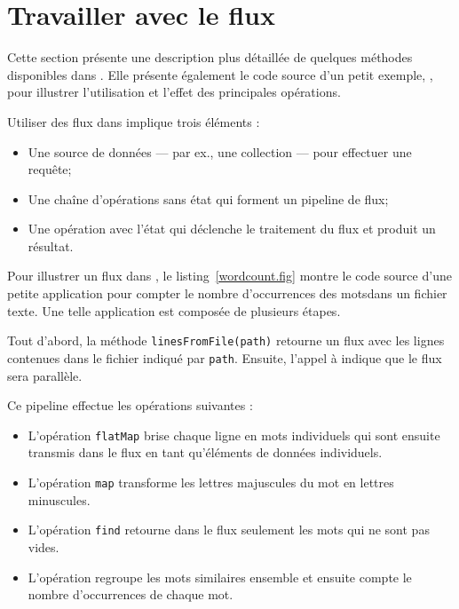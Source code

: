 \section{Travailler avec le flux}

Cette section pr\'esente une description plus d\'etaill\'ee de quelques m\'ethodes disponibles dans \PpFf. Elle pr\'esente \'egalement le code source d'un petit exemple, , pour illustrer l'utilisation et l'effet des principales op\'erations. 

Utiliser des flux dans \PpFf{} implique trois \'el\'ements : 
\begin{itemize}
	\item Une source de donn\'ees --- par ex., une collection --- pour effectuer une requ\^ete;

	\item Une cha\^ine d'op\'erations sans \'etat qui forment un pipeline de flux;

	\item Une op\'eration avec l'\'etat qui d\'eclenche le traitement du flux et produit un r\'esultat.
\end{itemize}

Pour illustrer un flux dans \PpFf, le listing~\ref{wordcount.fig} montre le code source d'une petite application pour compter le nombre d'occurrences des motsdans un fichier texte. Une telle application est compos\'ee de plusieurs \'etapes. 

Tout d'abord, la m\'ethode \texttt{linesFromFile(path)}  retourne un flux avec les lignes contenues dans le fichier indiqu\'e par \texttt{path}. Ensuite, l'appel \`a  indique que le flux sera parall\`ele.


Ce pipeline effectue les op\'erations suivantes :
\begin{itemize}

	\item L'op\'eration \texttt{flatMap} brise chaque ligne en mots individuels qui sont ensuite transmis dans le flux en tant qu'\'el\'ements de donn\'ees individuels.

	\item L'op\'eration \texttt{map} transforme les lettres majuscules du mot en lettres minuscules.

	\item L'op\'eration \texttt{find} retourne dans le flux seulement les mots qui ne sont pas vides.



	\item L'op\'eration   regroupe les mots similaires ensemble et ensuite compte le nombre d'occurrences de chaque mot. 
\end{itemize}


